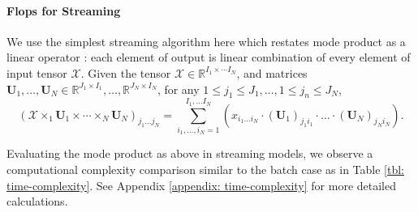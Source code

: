 \paragraph{Flops for Streaming}
We use the simplest streaming algorithm here which restates mode product as a linear operator : each element of output is linear combination of every element of input tensor $\mathscr{X}$. Given the tensor $\mathscr{X} \in \mathbb{R}^{I_1 \times \cdots I_N}$, and matrices $\mathbf{U}_1, \dots, \mathbf{U}_N \in \mathbb{R}^{J_1 \times I_1}, \dots, \mathbb{R}^{J_N \times I_N}$, for any $1 \leq j_1 \leq J_1, \dots, 1 \leq j_n \leq J_N$, 
\begin{equation} \label{eq: elementise-product}
(\mathscr{X} \times_1 \mathbf{U}_1 \times \cdots \times_N \mathbf{U}_N)_{j_1\dots j_N} = \sum_{i_1, \dots, i_N = 1}^{I_1, \dots I_N}(x_{i_1\dots i_N}\cdot (\mathbf{U}_1)_{j_1i_1} \cdot \dots \cdot (\mathbf{U}_N)_{j_Ni_N} ).
\end{equation}

Evaluating the mode product as above in streaming models, we observe a computational complexity comparison similar to the batch case as in Table \ref{tbl: time-complexity}. See Appendix \ref{appendix: time-complexity} for more detailed calculations. 
\fi 

